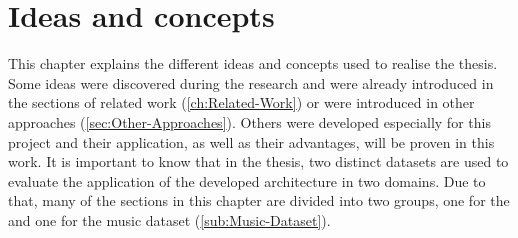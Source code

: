 \chapter{Ideas and concepts}
\label{ch:Ideas-Concepts}
This chapter explains the different ideas and concepts used to realise the thesis. Some ideas were discovered during the research and were already introduced in the sections of related work (\ref{ch:Related-Work}) or were introduced in other approaches (\ref{sec:Other-Approaches}). Others were developed especially for this project and their application, as well as their advantages, will be proven in this work.
\newline
\newline
It is important to know that in the thesis, two distinct datasets are used to evaluate the application of the developed architecture in two domains. Due to that, many of the sections in this chapter are divided into two groups, one for the  and one for the music dataset (\ref{sub:Music-Dataset}).

